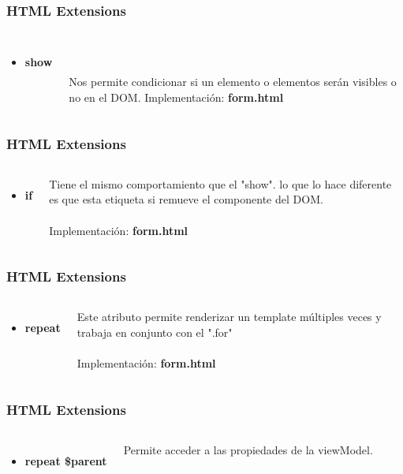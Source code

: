 \documentclass{beamer}
\begin{document}
\begin{frame}
\frametitle{HTML Extensions}
\begin{columns}[c]
\begin{itemize}
\item \textbf{show}
\end{itemize}
\\~\\
Nos permite condicionar si un elemento o elementos ser\'an visibles o no en el DOM.
Implementaci\'on: \textbf{form.html}
\end{columns}
\end{frame}
\begin{frame}
\frametitle{HTML Extensions}
\begin{columns}[c]
\begin{itemize}
\item \textbf{if}
\end{itemize}
Tiene el mismo comportamiento que el "show". lo que lo hace diferente es que esta etiqueta si remueve el componente del DOM.
\\~\\
Implementaci\'on: \textbf{form.html}
\end{columns}
\end{frame}
\begin{frame}
\frametitle{HTML Extensions}
\begin{columns}[c]
\begin{itemize}
\item \textbf{repeat}
\end{itemize}
Este atributo permite renderizar un template m\'ultiples veces y trabaja en conjunto con el ".for"
\\~\\
Implementaci\'on: \textbf{form.html}
\end{columns}
\end{frame}
\begin{frame}
\frametitle{HTML Extensions}
\begin{columns}[c]
\begin{itemize}
\item \textbf{repeat \$parent}
\end{itemize}
Permite acceder a las propiedades de la viewModel.
\end{columns}
\end{frame}
\end{document}
